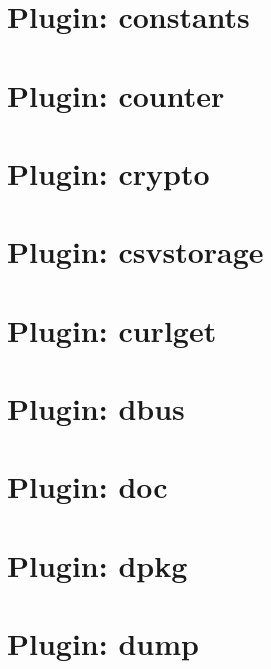 \documentclass[twoside]{book}
\newcommand{\+}{\discretionary{\mbox{\scriptsize$\hookleftarrow$}}{}{}}
\begin{document}
\chapter{Plugin\+: constants}
\label{md_src_plugins_constants_README}
\hypertarget{md_src_plugins_constants_README}{}

\chapter{Plugin\+: counter}
\label{md_src_plugins_counter_README}
\hypertarget{md_src_plugins_counter_README}{}

\chapter{Plugin\+: crypto}
\label{md_src_plugins_crypto_README}
\hypertarget{md_src_plugins_crypto_README}{}

\chapter{Plugin\+: csvstorage}
\label{md_src_plugins_csvstorage_README}
\hypertarget{md_src_plugins_csvstorage_README}{}

\chapter{Plugin\+: curlget}
\label{md_src_plugins_curlget_README}
\hypertarget{md_src_plugins_curlget_README}{}

\chapter{Plugin\+: dbus}
\label{md_src_plugins_dbus_README}
\hypertarget{md_src_plugins_dbus_README}{}

\chapter{Plugin\+: doc}
\label{md_src_plugins_doc_README}
\hypertarget{md_src_plugins_doc_README}{}

\chapter{Plugin\+: dpkg}
\label{md_src_plugins_dpkg_README}
\hypertarget{md_src_plugins_dpkg_README}{}

\chapter{Plugin\+: dump}
\label{md_src_plugins_dump_README}
\hypertarget{md_src_plugins_dump_README}{}

\end{document}

